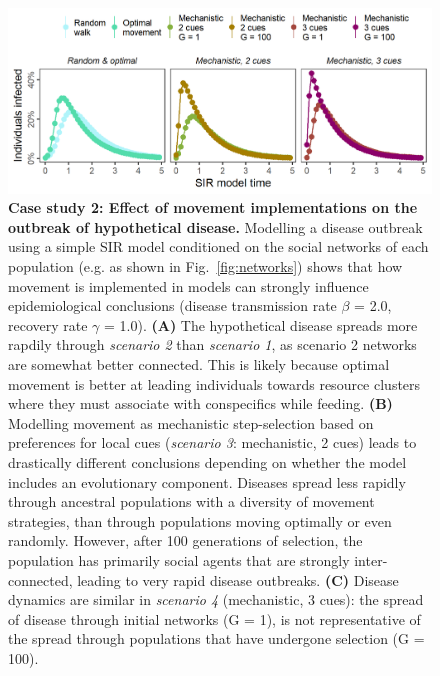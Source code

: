 \begin{figure}[!h]
    \centering
    \includegraphics[width=0.9\linewidth]{figures/introduction/fig_cs_2_2.png}
    \caption{
        \textbf{Case study 2: Effect of movement implementations on the outbreak of hypothetical disease.}
        Modelling a disease outbreak using a simple SIR model conditioned on the social networks of each population (e.g. as shown in Fig.~\ref{fig:networks}) shows that how movement is implemented in models can strongly influence epidemiological conclusions (disease transmission rate $\beta$ = 2.0, recovery rate $\gamma$ = 1.0).
        \textbf{(A)} The hypothetical disease spreads more rapdily through \textit{scenario 2} than \textit{scenario 1}, as scenario 2 networks are somewhat better connected. This is likely because optimal movement is better at leading individuals towards resource clusters where they must associate with conspecifics while feeding.
        \textbf{(B)} Modelling movement as mechanistic step-selection based on preferences for local cues (\textit{scenario 3}: mechanistic, 2 cues) leads to drastically different conclusions depending on whether the model includes an evolutionary component. Diseases spread less rapidly through ancestral populations with a diversity of movement strategies, than through populations moving optimally or even randomly.
        However, after 100 generations of selection, the population has primarily social agents that are strongly inter-connected, leading to very rapid disease outbreaks.
        \textbf{(C)} Disease dynamics are similar in \textit{scenario 4} (mechanistic, 3 cues): the spread of disease through initial networks (G = 1), is not representative of the spread through populations that have undergone selection (G = 100).
    }
    \label{fig:sir}
  \end{figure}

